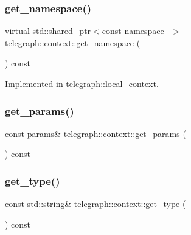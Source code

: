 \mbox{\label{classtelegraph_1_1context_a2f6c9ecc15cee66415828df9efa834a2}} 
\subsubsection{\texorpdfstring{get\+\_\+namespace()}{get\_namespace()}\hspace{0.1cm}{\footnotesize\ttfamily [2/2]}}
{\footnotesize\ttfamily virtual std\+::shared\+\_\+ptr$<$const \hyperlink{classtelegraph_1_1namespace__}{namespace\+\_\+}$>$ telegraph\+::context\+::get\+\_\+namespace (\begin{DoxyParamCaption}{ }\end{DoxyParamCaption}) const\hspace{0.3cm}{\ttfamily [pure virtual]}}



Implemented in \hyperlink{classtelegraph_1_1local__context_aba1ff115df4b54bae75ea41580ba32b5}{telegraph\+::local\+\_\+context}.

\mbox{\label{classtelegraph_1_1context_ab8f2cf6a295d840f8011ff1b5533a1f8}} 
\subsubsection{\texorpdfstring{get\+\_\+params()}{get\_params()}}
{\footnotesize\ttfamily const \hyperlink{classtelegraph_1_1params}{params}\& telegraph\+::context\+::get\+\_\+params (\begin{DoxyParamCaption}{ }\end{DoxyParamCaption}) const\hspace{0.3cm}{\ttfamily [inline]}}

\mbox{\label{classtelegraph_1_1context_a07d07a63d22454c2dc900c5cf749ce18}} 
\subsubsection{\texorpdfstring{get\+\_\+type()}{get\_type()}}
{\footnotesize\ttfamily const std\+::string\& telegraph\+::context\+::get\+\_\+type (\begin{DoxyParamCaption}{ }\end{DoxyParamCaption}) const\hspace{0.3cm}{\ttfamily [inline]}}

